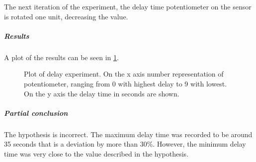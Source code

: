 The next iteration of the experiment, the delay time potentiometer on the sensor
is rotated one unit, decreasing the value.

\subparagraph{Results}

A plot of the results can be seen in \cref{fig:pir_delay}.

\begin{figure}[htbp]
\centering
{}
\caption[Delay experiment]{Plot of delay experiment. On the x axis number representation of potentiometer, ranging from 0 with highest delay to 9 with lowest. On the y axis the delay time in seconds are shown.}\label{fig:pir_delay}
\end{figure}

\subparagraph{Partial conclusion}

The hypothesis is incorrect. The maximum delay time was recorded to be
around 35 seconds that is a deviation by more than 30\%.
However, the minimum delay time was very close to the value
described in the hypothesis.
